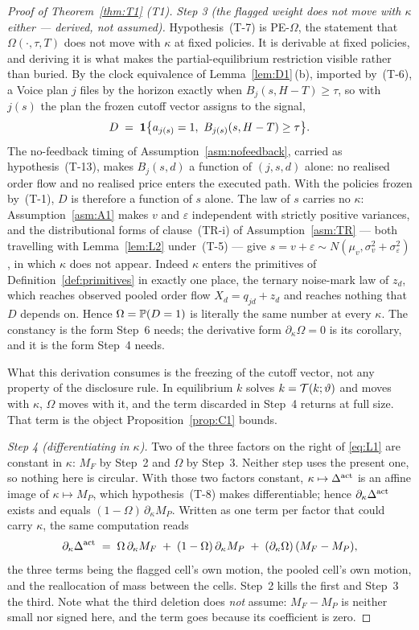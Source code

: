 \begin{proof}[Proof of Theorem~\ref{thm:T1} (T1)]
\emph{Step 3 (the flagged weight does not move with $\kappa$ either --- derived, not assumed).}
Hypothesis~(T-7) is PE-$\Omega$, the statement that $\Omega(\cdot,\tau,T)$ does not move with
$\kappa$ at fixed policies. It is derivable at fixed policies, and deriving it is what makes the
partial-equilibrium restriction visible rather than buried. By the clock equivalence of
Lemma~\ref{lem:D1}\,(b), imported by~(T-6), a Voice plan $j$ files by the horizon exactly when
$B_j(s,H-T) \ge \tau$, so with $j(s)$ the plan the frozen cutoff vector assigns to the signal,
\[
D \;=\; \mathbf{1}\bigl\{a_{j(s)} = 1,\ B_{j(s)}(s,H-T) \ge \tau\bigr\}.
\]
The no-feedback timing of Assumption~\ref{asm:nofeedback}, carried as hypothesis~(T-13), makes
$B_j(s,d)$ a function of $(j,s,d)$ alone: no realised order flow and no realised price enters the
executed path. With the policies frozen by~(T-1), $D$ is therefore a function of $s$ alone. The law
of $s$ carries no $\kappa$: Assumption~\ref{asm:A1} makes $v$ and $\varepsilon$ independent with
strictly positive variances, and the distributional forms of clause~(TR-i) of
Assumption~\ref{asm:TR} --- both travelling with Lemma~\ref{lem:L2} under~(T-5) --- give
$s = v + \varepsilon \sim N(\mu_v,\sigma_v^2+\sigma_\varepsilon^2)$, in which $\kappa$ does not
appear. Indeed $\kappa$ enters the primitives of Definition~\ref{def:primitives} in exactly one
place, the ternary noise-mark law of $z_d$, which reaches observed pooled order flow
$X_d = q_{jd} + z_d$ and reaches nothing that $D$ depends on. Hence $\Omega = \mathbb{P}(D=1)$ is
literally the same number at every $\kappa$. The constancy is the form Step~6 needs; the derivative
form $\partial_\kappa\Omega = 0$ is its corollary, and it is the form Step~4 needs.

What this derivation consumes is the freezing of the cutoff vector, not any property of the
disclosure rule. In equilibrium $k$ solves $k = \mathcal{T}(k;\vartheta)$ and moves with $\kappa$,
$\Omega$ moves with it, and the term discarded in Step~4 returns at full size. That term is the
object Proposition~\ref{prop:C1} bounds.

\emph{Step 4 (differentiating in $\kappa$).} Two of the three factors on the right of \eqref{eq:L1}
are constant in $\kappa$: $M_F$ by Step~2 and $\Omega$ by Step~3. Neither step uses the present one,
so nothing here is circular. With those two factors constant, $\kappa \mapsto \Delta^{\mathrm{act}}$ is an affine
image of $\kappa \mapsto M_P$, which hypothesis~(T-8) makes differentiable; hence
$\partial_\kappa\Delta^{\mathrm{act}}$ exists and equals $(1-\Omega)\,\partial_\kappa M_P$. Written as one term per
factor that could carry $\kappa$, the same computation reads
\begin{equation}
\label{eq:T1-three}
\partial_\kappa\Delta^{\mathrm{act}}
\;=\; \Omega\,\partial_\kappa M_F
\;+\; (1-\Omega)\,\partial_\kappa M_P
\;+\; (\partial_\kappa\Omega)\,(M_F - M_P),
\end{equation}
the three terms being the flagged cell's own motion, the pooled cell's own motion, and the
reallocation of mass between the cells. Step~2 kills the first and Step~3 the third. Note what the
third deletion does \emph{not} assume: $M_F - M_P$ is neither small nor signed here, and the term
goes because its coefficient is zero.


\end{proof}
